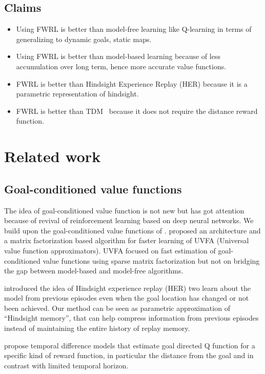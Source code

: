 \documentclass[letterpaper]{article} %
\begin{document}
\subsection{Claims}
\begin{itemize} \item
Using FWRL is better than model-free learning like Q-learning in terms of generalizing to dynamic goals, static maps.
\item 
Using FWRL is better than model-based learning because of less accumulation over long term, hence more accurate value functions.
\item FWRL is better than Hindsight Experience Replay (HER) \cite{andrychowicz2016learning} because it is a parametric representation of hindsight.
\item FWRL is better than TDM~\cite{pong2018temporal} because it does not require the distance reward function.
\end{itemize}

\section{Related work}
\subsection{Goal-conditioned value functions}
The idea of goal-conditioned value function is not new but has got attention because of revival of reinforcement learning based on deep neural networks.
We build upon the goal-conditioned value functions of \citet{schaul2015universal}.
\citet{schaul2015universal} proposed an architecture and a matrix factorization based algorithm for faster learning of UVFA (Universal value function approximators).
UVFA focused on fast estimation of goal-conditioned value functions using sparse
matrix factorization but not on bridging the gap between model-based and model-free
algorithms.


\citet{andrychowicz2016learning} introduced the idea of Hindsight experience replay (HER) two learn about the model from previous episodes even when the goal location has changed or not been achieved.
Our method can be seen as parametric approximation of ``Hindsight memory'',
that can help compress information from previous episodes instead of maintaining the
entire history of replay memory.

\cite{pong2018temporal} propose temporal difference models that estimate goal directed Q function for a specific kind of reward function, in particular the distance from the goal and in contrast with limited temporal horizon.
\end{document}
